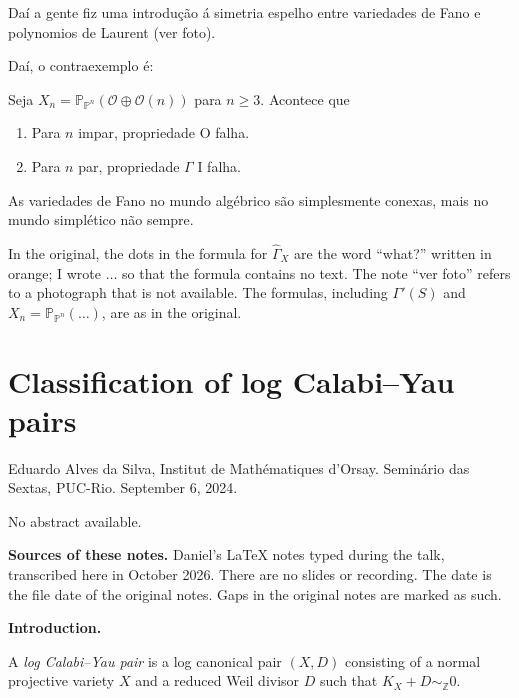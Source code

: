Da\'i a gente fiz uma introduç\~ao \'a
simetria espelho entre variedades de Fano e
polynomios de Laurent (ver foto).

Da\'i, o contraexemplo \'e:

\medskip{}
Seja
$X_n=\mathbb{P}_{\mathbb{P}^n}(\mathcal{O}
\oplus\mathcal{O}(n))$ para $n\geq 3$.
Acontece que
\begin{enumerate}
\item Para $n$ impar, propriedade O falha.
\item Para $n$ par, propriedade $\Gamma$ I
falha.
\end{enumerate}

As variedades de Fano no mundo alg\'ebrico
s\~ao simplesmente conexas, mais no mundo
simpl\'etico n\~ao sempre.

\medskip{} In
the original, the dots in the formula for
$\hat{\Gamma}_X$ are the word ``what?''
written in orange; I wrote $\ldots$ so that
the formula contains no text. The note ``ver
foto'' refers to a photograph that is not
available. The formulas, including
$\Gamma'(S)$ and
$X_n=\mathbb{P}_{\mathbb{P}^n}(\ldots)$, are
as in the original.

\section{Classification of log Calabi--Yau
pairs}
\label{section-alves-log-calabi-yau}

\noindent
Eduardo Alves da Silva, Institut de
Mathématiques d'Orsay.
Seminário das Sextas, PUC-Rio.
September 6, 2024.

\medskip\noindent
No abstract available.

\medskip\noindent
{\bf Sources of these notes.} Daniel's
LaTeX notes typed during the talk,
transcribed here in October 2026. There are
no slides or recording. The date is the
file date of the original notes. Gaps in
the original notes are marked as such.

\medskip\noindent
{\bf Introduction.}

\begin{definition}
\label{definition-alves-log-cy-pair}
A \emph{log Calabi--Yau pair} is a log
canonical pair $(X,D)$ consisting of a
normal projective variety $X$ and a reduced
Weil divisor $D$ such that
$K_X+D\sim_{\mathbb{Z}}0$.
\end{definition}

